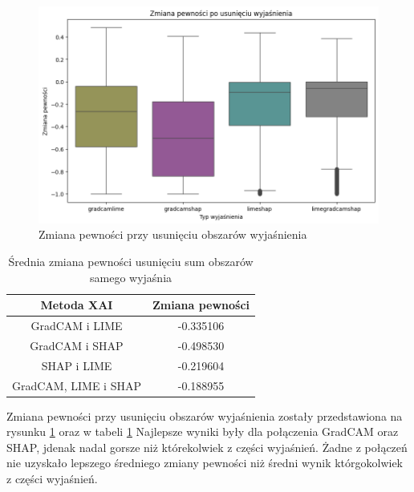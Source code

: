 \begin{figure}
	\centering\includegraphics[width=.6\textwidth]{img/combine_confidence_no_exp_and}
	\caption{Zmiana pewności przy usunięciu obszarów wyjaśnienia}  \label{rys:combineandconfidenceandno}
\end{figure}
\begin{table}
	\centering
	\begin{tabular}{|c|c|}
		\hline
		\textbf{Metoda XAI}  & Zmiana pewności \\
		\hline
		GradCAM i LIME       & -0.335106       \\
		\hline
		GradCAM i SHAP       & -0.498530       \\
		\hline
		SHAP i LIME          & -0.219604       \\
		\hline
		GradCAM, LIME i SHAP & -0.188955       \\
		\hline
	\end{tabular}
	\caption{Średnia zmiana pewności usunięciu sum obszarów samego wyjaśnia}
	\label{tab:combineandconfidenceandno}
\end{table}
Zmiana pewności przy usunięciu obszarów wyjaśnienia zostały przedstawiona na rysunku \ref{rys:combineandconfidenceandno} oraz w tabeli \ref{tab:combineandconfidenceandno}
Najlepsze wyniki były dla połączenia GradCAM oraz SHAP, jdenak nadal gorsze niż którekolwiek z części wyjaśnień.
Żadne z połączeń nie uzyskało lepszego średniego zmiany pewności niż średni wynik którgokolwiek z części wyjaśnień.


